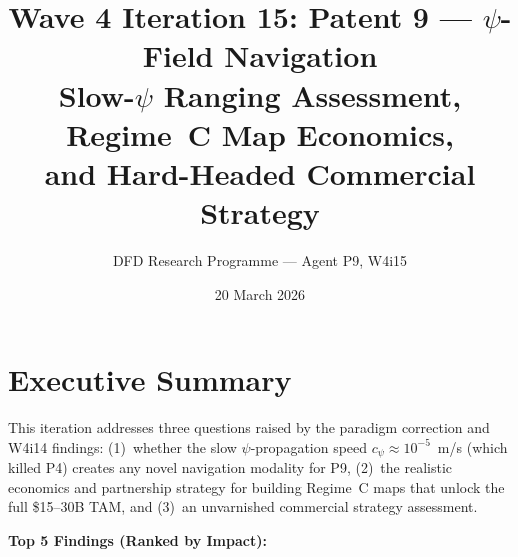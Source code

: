\documentclass[11pt]{article}
\title{\textbf{Wave 4 Iteration 15: Patent 9 --- $\psi$-Field Navigation}\\[6pt]
Slow-$\psi$ Ranging Assessment, Regime~C Map Economics,\\
and Hard-Headed Commercial Strategy}
\author{DFD Research Programme --- Agent P9, W4i15}
\date{20 March 2026}
\theoremstyle{definition}
\theoremstyle{remark}
\begin{document}
\maketitle
\tableofcontents
\newpage

\section*{Executive Summary}

This iteration addresses three questions raised by the paradigm correction
and W4i14 findings: (1)~whether the slow $\psi$-propagation speed
$c_\psi \approx 10^{-5}$~m/s (which killed P4) creates any novel
navigation modality for P9, (2)~the realistic economics and partnership
strategy for building Regime~C maps that unlock the full \$15--30B TAM,
and (3)~an unvarnished commercial strategy assessment.

\textbf{Top 5 Findings (Ranked by Impact):}
\end{document}
